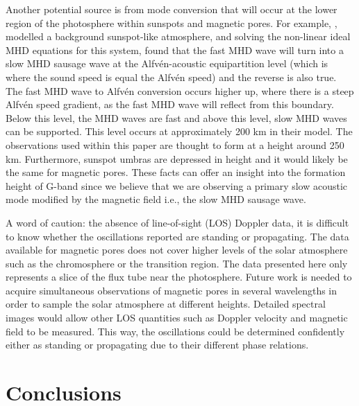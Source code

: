 	Another potential source is from mode conversion that will occur at the lower region of the photosphere within sunspots and magnetic pores.
	For example, \cite{0004-637X-746-1-68}, modelled a background sunspot-like atmosphere, and solving the non-linear ideal MHD equations for this system, found that the fast MHD wave will turn into a slow MHD sausage wave at the Alfv\'en-acoustic equipartition level (which is where the sound speed is equal the Alfv\'en speed) and the reverse is also true.
	The fast MHD wave to Alfv\'en conversion occurs higher up, where there is a steep Alfv\'en speed gradient, as the fast MHD wave will reflect from this boundary.
	Below this level, the MHD waves are fast and above this level, slow MHD waves can be supported.
	This level occurs at approximately 200 km in their model.
	The observations used within this paper are thought to form at a height around 250 km.
	Furthermore, sunspot umbras are depressed in height and it would likely be the same for magnetic pores.
	These facts can offer an insight into the formation height of G-band since we believe that we are observing a primary slow acoustic mode modified by the magnetic field i.e., the slow MHD sausage wave.
	    
    A word of caution: the absence of line-of-sight (LOS) Doppler data, it is difficult to know whether the oscillations reported are standing or propagating.
    The data available for magnetic pores does not cover higher levels of the solar atmosphere such as the chromosphere or the transition region.
    The data presented here only represents a slice of the flux tube near the photosphere.
    Future work is needed to acquire simultaneous observations of magnetic pores in several wavelengths in order to sample the solar atmosphere at different heights.
    Detailed spectral images would allow other LOS quantities such as Doppler velocity and magnetic field to be measured.
    This way, the oscillations could be determined confidently either as standing or propagating due to their different phase relations. 
    
    \section{Conclusions}
    \label{conc}
    
